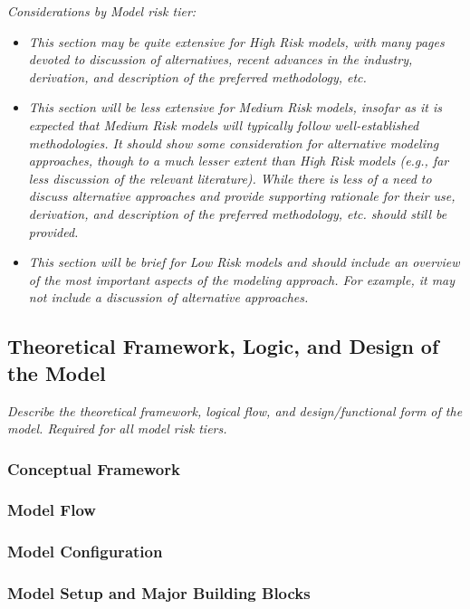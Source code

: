 \documentclass[12pt,letterpaper]{article}
\begin{document}
\textit{Considerations by Model risk tier:}
\begin{itemize}
\item \textit{This section may be quite extensive for High Risk models, with many pages devoted to discussion of alternatives, recent advances in the industry, derivation, and description of the preferred methodology, etc.}
\item \textit{This section will be less extensive for Medium Risk models, insofar as it is expected that Medium Risk models will typically follow well-established methodologies. It should show some consideration for alternative modeling approaches, though to a much lesser extent than High Risk models (e.g., far less discussion of the relevant literature). While there is less of a need to discuss alternative approaches and provide supporting rationale for their use, derivation, and description of the preferred methodology, etc. should still be provided.}
\item \textit{This section will be brief for Low Risk models and should include an overview of the most important aspects of the modeling approach. For example, it may not include a discussion of alternative approaches.}
\end{itemize}

\subsection{Theoretical Framework, Logic, and Design of the Model}
\textit{Describe the theoretical framework, logical flow, and design/functional form of the model. Required for all model risk tiers.}

\subsubsection{Conceptual Framework}

\subsubsection{Model Flow}

\subsubsection{Model Configuration}

\subsubsection{Model Setup and Major Building Blocks}
\end{document}
